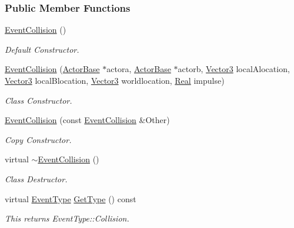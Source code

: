 \subsubsection*{Public Member Functions}
\begin{DoxyCompactItemize}
\item 
\hypertarget{classphys_1_1EventCollision_af44ef170326f56879e9e4608984a4196}{
\hyperlink{classphys_1_1EventCollision_af44ef170326f56879e9e4608984a4196}{EventCollision} ()}
\label{classphys_1_1EventCollision_af44ef170326f56879e9e4608984a4196}

\begin{DoxyCompactList}\small\item\em Default Constructor. \item\end{DoxyCompactList}\item 
\hyperlink{classphys_1_1EventCollision_a0f5a0862cde3b7db4482be6984434742}{EventCollision} (\hyperlink{classphys_1_1ActorBase}{ActorBase} $\ast$actora, \hyperlink{classphys_1_1ActorBase}{ActorBase} $\ast$actorb, \hyperlink{classphys_1_1Vector3}{Vector3} localAlocation, \hyperlink{classphys_1_1Vector3}{Vector3} localBlocation, \hyperlink{classphys_1_1Vector3}{Vector3} worldlocation, \hyperlink{namespacephys_af7eb897198d265b8e868f45240230d5f}{Real} impulse)
\begin{DoxyCompactList}\small\item\em Class Constructor. \item\end{DoxyCompactList}\item 
\hyperlink{classphys_1_1EventCollision_a85c999154866380d232ddcdfd9534c85}{EventCollision} (const \hyperlink{classphys_1_1EventCollision}{EventCollision} \&Other)
\begin{DoxyCompactList}\small\item\em Copy Constructor. \item\end{DoxyCompactList}\item 
virtual \hyperlink{classphys_1_1EventCollision_afcbf057fc955ce6c05b21c08325b1822}{$\sim$EventCollision} ()
\begin{DoxyCompactList}\small\item\em Class Destructor. \item\end{DoxyCompactList}\item 
virtual \hyperlink{classphys_1_1EventBase_a5e6a8564e127f654123f0bf6a2751923}{EventType} \hyperlink{classphys_1_1EventCollision_a96c2809f1bbab78b9f2758cea15a9a36}{GetType} () const 
\begin{DoxyCompactList}\small\item\em This returns EventType::Collision. \item\end{DoxyCompactList}\end{DoxyCompactItemize}
